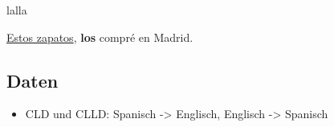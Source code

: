 lalla

\begin{exe}
    \ex \uline{Estos zapatos}, \textbf{los} compré en Madrid.
\end{exe}

\subsection{Daten}
\begin{itemize}
    \item \cite{Valenzuela05} CLD und CLLD: Spanisch -> Englisch, Englisch -> Spanisch
%
%
\end{itemize}
